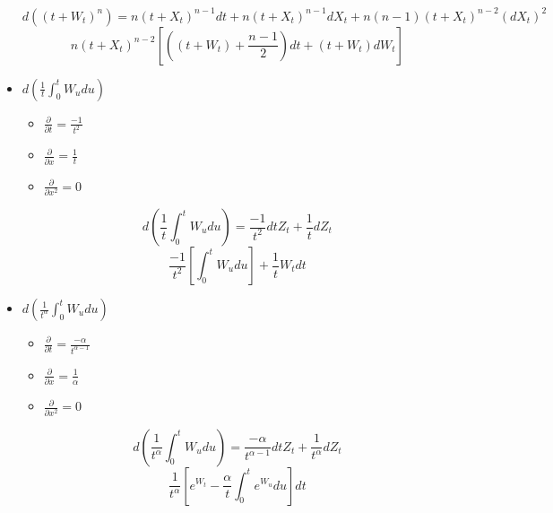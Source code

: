 \documentclass[11pt,fleqn]{book} %
\numberwithin{equation}{section} %
\numberwithin{figure}{section} %
\numberwithin{table}{section} %
\begin{document}
\begin{itemize}
    $$ d((t+W_{t})^{n}) = n(t + X_{t})^{n-1} dt + n(t+X_{t})^{n-1}dX_{t} + n(n-1)(t+X_{t})^{n-2} (dX_{t})^{2}      $$
    $$ n(t+X_{t})^{n-2}[((t+W_{t}) + \frac{n-1}{2}) dt + (t+W_{t})dW_{t}]  $$
    \item $ d(\frac{1}{t} \int_{0}^{t} W_{u} du )$
    \begin{itemize}
        \item $\frac{\partial}{\partial t} = \frac{-1}{t^{2}}$
        \item $\frac{\partial}{\partial x} = \frac{1}{t}$
        \item $\frac{\partial}{\partial x^{2}}= 0 $
    \end{itemize}
    $$ d(\frac{1}{t} \int_{0}^{t} W_{u} du)  = \frac{-1}{t^{2}} dt Z_{t} +  \frac{1}{t} dZ_{t}    $$
    $$\frac{-1}{t^{2}} [\int_{0}^{t} W_{u} du] +  \frac{1}{t} W_{t}dt $$
    \item $ d(\frac{1}{t^{\alpha}} \int_{0}^{t} W_{u} du )$
    \begin{itemize}
        \item $\frac{\partial}{\partial t} = \frac{-\alpha}{t^{\alpha-1}}$
        \item $\frac{\partial}{\partial x} = \frac{1}{\alpha}$
        \item $\frac{\partial}{\partial x^{2}}= 0 $
    \end{itemize}
    $$ d(\frac{1}{t^{\alpha}} \int_{0}^{t} W_{u} du )  = \frac{-\alpha}{t^{\alpha-1}} dt Z_{t} +  \frac{1}{t^{\alpha}} dZ_{t}    $$
    $$\frac{1}{t^{\alpha}} [e^{W_{t}} - \frac{\alpha}{t} \int_{0}^{t} e^{W_{u}} du] dt $$
\end{itemize}
\end{document}
